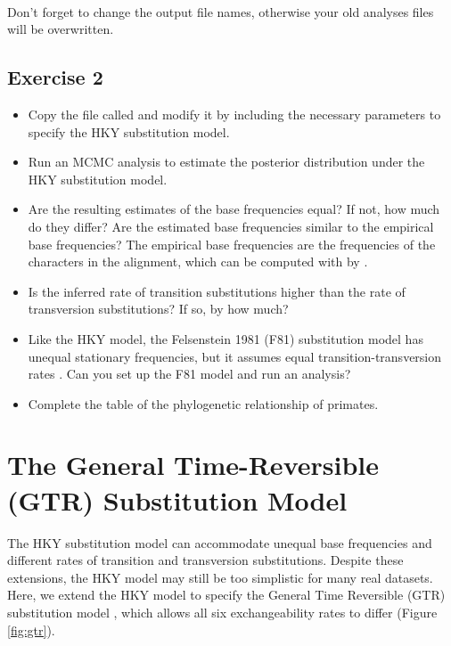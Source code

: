 \noindent \\ \impmark Don't forget to change the output file names, otherwise your old analyses files will be overwritten.

\subsection{Exercise 2}

\begin{itemize}
\item Copy the file called   and modify it by including the necessary parameters to specify the HKY substitution model.
\item Run an MCMC analysis to estimate the posterior distribution under the HKY substitution model.
\item Are the resulting estimates of the base frequencies equal? 
	If not, how much do they differ? 
	Are the estimated base frequencies similar to the empirical base frequencies? 
	The empirical base frequencies are the frequencies of the characters in the alignment, which can be computed with \RevBayes by .
\item Is the inferred rate of transition substitutions higher than the rate of transversion substitutions? If so, by how much?
\item Like the HKY model, the Felsenstein 1981 (F81) substitution model has unequal stationary frequencies, but it assumes equal transition-transversion rates \citep{Felsenstein1981}.
	Can you set up the F81 model and run an analysis?
\item Complete the table of the phylogenetic relationship of primates.
\end{itemize}






\newpage
\section{The General Time-Reversible (GTR) Substitution Model}

The HKY substitution model can accommodate unequal base frequencies and different rates of transition and transversion substitutions.
Despite these extensions, the HKY model may still be too simplistic for many real datasets.
Here, we extend the HKY model to specify the General Time Reversible (GTR) substitution model \citep{Tavare1986}, which allows all six exchangeability rates to differ (Figure \ref{fig:gtr}).

